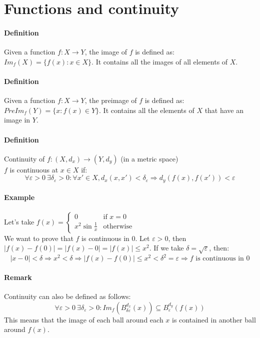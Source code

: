 \documentclass{article}
\newcommand{\DS}{\displaystyle}
\newcommand{\abs}[1]{\left|#1\right|}
\newcommand{\func}[3]{#1 : #2 \rightarrow #3}
\newcommand{\Ep}{\varepsilon}
\newcommand{\Def}{\paragraph{Definition}}
\newcommand{\Remark}{\paragraph{Remark}}
\newcommand{\Example}{\paragraph{Example}}
\begin{document}
\section{Functions and continuity}

  \Def Given a function $\func{f}{X}{Y}$, the image of $f$ is defined as:
  $Im_f(X) = \{ f(x) : x \in X \}$. It contains all the images of all elements
  of $X$.

  \Def Given a function $\func{f}{X}{Y}$, the preimage of $f$ is defined as:
  $PreIm_f(Y) = \{ x : f(x) \in Y \}$. It contains all the elements of $X$ that
  have an image in $Y$.

  \Def Continuity of $\func{f}{(X,d_x)}{(Y,d_y)}$ (in a metric space)
\\$f$ is continuous at $x \in X$ if:
  \begin{equation*}
    \forall \Ep > 0 \ \exists \delta_\Ep > 0 : \forall x' \in X,
    d_x(x,x') < \delta_\Ep \Rightarrow d_y(f(x),f(x')) < \Ep
  \end{equation*}

  \Example Let's take $\DS f(x) = \begin{cases} 0 & \text{if } x = 0 \\ x^2
  \sin\frac{1}{x} & \text{otherwise} \end{cases}$
\\We want to prove that $f$ is continuous in 0. Let $\Ep > 0$, then
  $\abs{f(x) - f(0)} = \abs{f(x) - 0} = \abs{f(x)} \leq x^2$. If we take $\delta
  = \sqrt{\Ep}$, then:
  \begin{equation*}
    \abs{x - 0} < \delta \Rightarrow x^2 < \delta \Rightarrow \abs{f(x) - f(0)}
    \leq x^2 < \delta^2 = \Ep \Rightarrow f \text{ is continuous in 0}
  \end{equation*}

  \Remark Continuity can also be defined as follows:
  \begin{equation*}
    \forall \Ep > 0 \ \exists \delta_\Ep > 0 :
    Im_f(B_{\delta\Ep}^{d_x}(x)) \subseteq B_\Ep^{d_y}(f(x))
  \end{equation*}
  This means that the image of each ball around each $x$ is contained in another
  ball around $f(x)$.
\end{document}
